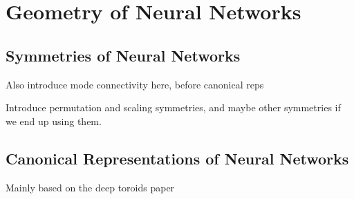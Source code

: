 
\chapter{Geometry of Neural Networks}\label{section:geometry_of_nns}

\section{Symmetries of Neural Networks}

Also introduce mode connectivity here, before canonical reps 

Introduce permutation and scaling symmetries, and maybe other symmetries if we end up using them. 

\section{Canonical Representations of Neural Networks}

Mainly based on the deep toroids paper